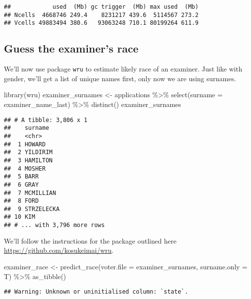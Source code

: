 \documentclass[
]{article}
\newenvironment{Shaded}{\begin{snugshade}}{\end{snugshade}}
\newcommand{\AttributeTok}[1]{\textcolor[rgb]{0.77,0.63,0.00}{#1}}
\newcommand{\FunctionTok}[1]{\textcolor[rgb]{0.00,0.00,0.00}{#1}}
\newcommand{\NormalTok}[1]{#1}
\newcommand{\OtherTok}[1]{\textcolor[rgb]{0.56,0.35,0.01}{#1}}
\newcommand{\SpecialCharTok}[1]{\textcolor[rgb]{0.00,0.00,0.00}{#1}}
\begin{document}
\begin{verbatim}
##            used  (Mb) gc trigger  (Mb) max used  (Mb)
## Ncells  4668746 249.4    8231217 439.6  5114567 273.2
## Vcells 49883494 380.6   93063248 710.1 80199264 611.9
\end{verbatim}

\hypertarget{guess-the-examiners-race}{%
\subsection{Guess the examiner's race}\label{guess-the-examiners-race}}

We'll now use package \texttt{wru} to estimate likely race of an
examiner. Just like with gender, we'll get a list of unique names first,
only now we are using surnames.

\begin{Shaded}
\begin{Highlighting}[]
\FunctionTok{library}\NormalTok{(wru)}
\NormalTok{examiner\_surnames }\OtherTok{\textless{}{-}}\NormalTok{ applications }\SpecialCharTok{\%\textgreater{}\%} 
  \FunctionTok{select}\NormalTok{(}\AttributeTok{surname =}\NormalTok{ examiner\_name\_last) }\SpecialCharTok{\%\textgreater{}\%} 
  \FunctionTok{distinct}\NormalTok{()}
\NormalTok{examiner\_surnames}
\end{Highlighting}
\end{Shaded}

\begin{verbatim}
## # A tibble: 3,806 x 1
##    surname   
##    <chr>     
##  1 HOWARD    
##  2 YILDIRIM  
##  3 HAMILTON  
##  4 MOSHER    
##  5 BARR      
##  6 GRAY      
##  7 MCMILLIAN 
##  8 FORD      
##  9 STRZELECKA
## 10 KIM       
## # ... with 3,796 more rows
\end{verbatim}

We'll follow the instructions for the package outlined here
\url{https://github.com/kosukeimai/wru}.

\begin{Shaded}
\begin{Highlighting}[]
\NormalTok{examiner\_race }\OtherTok{\textless{}{-}} \FunctionTok{predict\_race}\NormalTok{(}\AttributeTok{voter.file =}\NormalTok{ examiner\_surnames, }\AttributeTok{surname.only =}\NormalTok{ T) }\SpecialCharTok{\%\textgreater{}\%} 
  \FunctionTok{as\_tibble}\NormalTok{()}
\end{Highlighting}
\end{Shaded}

\begin{verbatim}
## Warning: Unknown or uninitialised column: `state`.
\end{verbatim}
\end{document}
